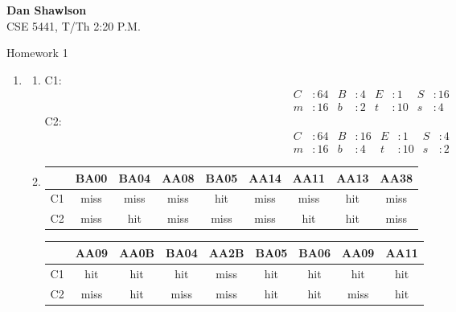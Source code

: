 \documentclass{article}
\begin{document}
  
  \begin{flushright}
  \textbf{Dan Shawlson} \\
  CSE 5441, T/Th 2:20 P.M.
  \end{flushright}
  
  \begin{Large}
  \centerline{Homework 1}
  \end{Large}
  
  \begin{enumerate}
    \item
      \begin{enumerate}
        \item
        C1:\\
        \begin{align*}
        C&: 64 & B&: 4 & E&: 1 & S&: 16 \\
        m&: 16 & b&: 2 & t&: 10 & s&: 4
        \end{align*}
        C2:\\
        \begin{align*}
        C&: 64 & B&: 16 & E&: 1 & S&: 4\\
        m&: 16 & b&: 4 & t&: 10 & s&: 2
        \end{align*}
        \item
        \begin{tabular}{l|c|c|c|c|c|c|c|c}
           & BA00 & BA04 & AA08 & BA05 & AA14 & AA11 & AA13 & AA38 \\ \hline
          C1 & miss & miss & miss & hit & miss & miss & hit & miss \\ \hline
          C2 & miss & hit & miss & miss & miss & hit & hit & miss \\ \hline
        \end{tabular}
        \newline
        \vspace*{1 cm}
        \newline
        \begin{tabular}{l|c|c|c|c|c|c|c|c}
           & AA09 & AA0B & BA04 & AA2B & BA05 & BA06 & AA09 & AA11 \\ \hline
          C1 & hit & hit & hit & miss & hit & hit & hit & hit \\ \hline
          C2 & miss & hit & miss & miss & hit & hit & miss & hit \\ \hline
        \end{tabular}
        \newline
        \vspace*{1 cm}

\end{enumerate}
\end{enumerate}
\end{document}

